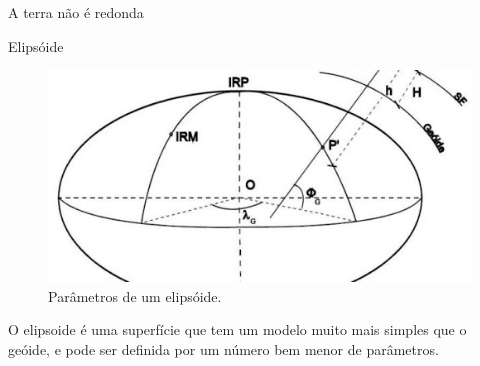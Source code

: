 \documentclass[9pt,ignorenonframetext,]{beamer}
\begin{document}
\begin{frame}{A terra não é redonda}
\protect\hypertarget{a-terra-nuxe3o-uxe9-redonda-1}{}

\begin{block}{Elipsóide}

\begin{figure}[H]

{\centering \includegraphics[width=0.7\linewidth]{images/elipsoide} 

}

\caption{Parâmetros de um elipsóide.}\label{fig:unnamed-chunk-6}
\end{figure}

O elipsoide é uma superfície que tem um modelo muito mais simples que o
geóide, e pode ser definida por um número bem menor de parâmetros.

\end{block}

\end{frame}
\end{document}
